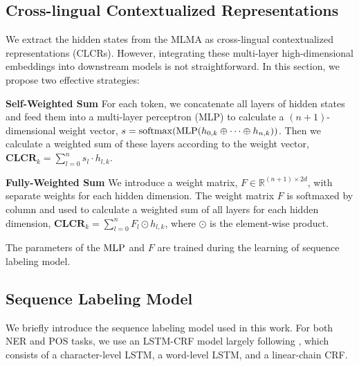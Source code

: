 \documentclass[11pt,a4paper]{article}
\begin{document}
	\subsection{Cross-lingual Contextualized Representations}
	We extract the hidden states from the MLMA as cross-lingual contextualized representations (CLCRs). However, integrating these multi-layer high-dimensional embeddings into downstream models is not straightforward. In this section, we propose two effective strategies:
	
	\noindent\textbf{Self-Weighted Sum} For each token, we concatenate all layers of hidden states and feed them into a multi-layer perceptron (MLP) to calculate a $(n+1)$-dimensional weight vector, $s = {\rm softmax}({\rm MLP}(h_{0,k} \oplus \cdots \oplus h_{n,k}))$. Then we calculate a weighted sum of these layers according to the weight vector, $\textbf{CLCR}_k = \sum_{l=0}^n s_{l}\cdot h_{l,k}$.
	
	\noindent\textbf{Fully-Weighted Sum} We introduce a weight matrix, $F \in \mathbb{R}^{(n+1) \times 2d}$, with separate weights for each hidden dimension. The weight matrix $F$ is softmaxed by column and used to calculate a weighted sum of all layers for each hidden dimension, $\textbf{CLCR}_k = \sum_{l=0}^n F_l \odot h_{l,k}$, where $\odot$ is the element-wise product.
	
	The parameters of the ${\rm MLP}$ and $F$ are trained during the learning of sequence labeling model.
	
	
	\subsection{Sequence Labeling Model}
	We briefly introduce the sequence labeling model used in this work. For both NER and POS tasks, we use an LSTM-CRF model largely following \cite{lample16neural}, which consists of a character-level LSTM, a word-level LSTM, and a linear-chain CRF. 
	
\end{document}
